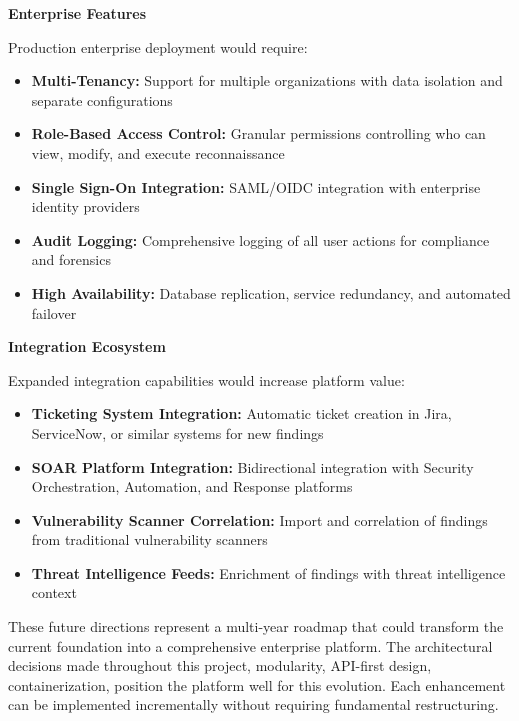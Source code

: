 \documentclass[a4paper,12pt]{report}
\begin{document}
\textbf{Enterprise Features}\hfill \break

Production enterprise deployment would require:

\begin{itemize}
\item \textbf{Multi-Tenancy:} Support for multiple organizations with data isolation and separate configurations
\item \textbf{Role-Based Access Control:} Granular permissions controlling who can view, modify, and execute reconnaissance
\item \textbf{Single Sign-On Integration:} SAML/OIDC integration with enterprise identity providers
\item \textbf{Audit Logging:} Comprehensive logging of all user actions for compliance and forensics
\item \textbf{High Availability:} Database replication, service redundancy, and automated failover
\end{itemize}

\textbf{Integration Ecosystem}\hfill \break

Expanded integration capabilities would increase platform value:

\begin{itemize}
\item \textbf{Ticketing System Integration:} Automatic ticket creation in Jira, ServiceNow, or similar systems for new findings
\item \textbf{SOAR Platform Integration:} Bidirectional integration with Security Orchestration, Automation, and Response platforms
\item \textbf{Vulnerability Scanner Correlation:} Import and correlation of findings from traditional vulnerability scanners
\item \textbf{Threat Intelligence Feeds:} Enrichment of findings with threat intelligence context
\end{itemize}


These future directions represent a multi-year roadmap that could transform the current foundation into a comprehensive enterprise platform. The architectural decisions made throughout this project, modularity, API-first design, containerization, position the platform well for this evolution. Each enhancement can be implemented incrementally without requiring fundamental restructuring.

\cleardoublepage
{}
{}
\end{document}
